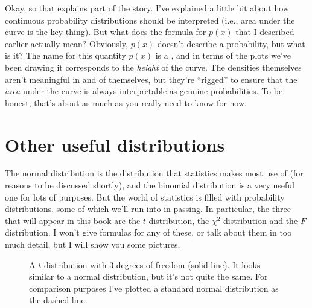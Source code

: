 Okay, so that explains part of the story. I've explained a little bit about how continuous probability distributions should be interpreted (i.e., area under the curve is the key thing). But what does the formula for $p(x)$ that I described earlier actually mean? Obviously, $p(x)$ doesn't describe a probability, but what is it? The name for this quantity $p(x)$ is a , and in terms of the plots we've been drawing it corresponds to the {\it height} of the curve. The densities themselves aren't meaningful in and of themselves, but they're ``rigged'' to ensure that the {\it area} under the curve is always interpretable as genuine probabilities. To be honest, that's about as much as you really need to know for now.


\section{Other useful distributions~\label{sec:otherdists}}

The normal distribution is the distribution that statistics makes most use of (for reasons to be discussed shortly), and the binomial distribution is a very useful one for lots of purposes. But the world of statistics is filled with probability distributions, some of which we'll run into in passing. In particular, the three that will appear in this book are the $t$ distribution, the $\chi^2$ distribution and the $F$ distribution. I won't give formulas for any of these, or talk about them in too much detail, but I will show you some pictures. 

\begin{figure}[!!h]
\begin{center}
\caption{A $t$ distribution with 3 degrees of freedom (solid line). It looks similar to a normal distribution, but it's not quite the same. For comparison purposes I've plotted a standard normal distribution as the dashed line.}
\label{fig:tdist}
\end{center}
\end{figure}

